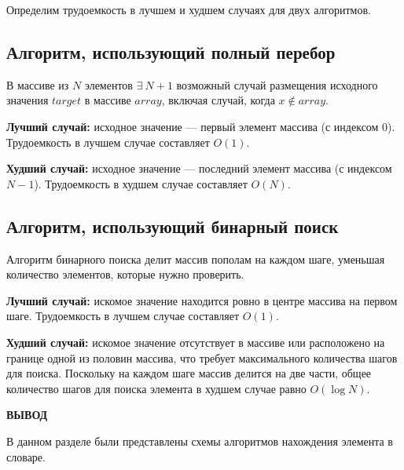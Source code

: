Определим трудоемкость в лучшем и худшем случаях для двух алгоритмов.

\subsection{Алгоритм, использующий полный перебор}

В массиве из $N$ элементов $\exists\ N+1$ возможный случай размещения исходного значения $target$ в массиве $array$, включая случай, когда $x \notin array$.

\textbf{Лучший случай:} исходное значение --- первый элемент массива (с индексом $0$). Трудоемкость в лучшем случае составляет $O(1)$.

\textbf{Худший случай:} исходное значение --- последний элемент массива (с индексом $N - 1$). Трудоемкость в худшем случае составляет $O(N)$.

\subsection{Алгоритм, использующий бинарный поиск}

Алгоритм бинарного поиска делит массив пополам на каждом шаге, уменьшая количество элементов, которые нужно проверить.

\textbf{Лучший случай:} искомое значение находится ровно в центре массива на первом шаге. Трудоемкость в лучшем случае составляет \(O(1)\).

\textbf{Худший случай:} искомое значение отсутствует в массиве или расположено на границе одной из половин массива, что требует максимального количества шагов для поиска. Поскольку на каждом шаге массив делится на две части, общее количество шагов для поиска элемента в худшем случае равно \(O(\log N)\).

\vspace{5mm}

\textbf{ВЫВОД}

 В данном разделе были представлены схемы алгоритмов нахождения элемента в словаре.

\clearpage